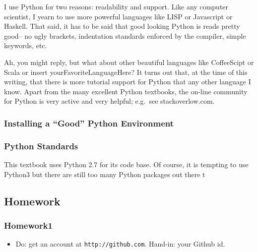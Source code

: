 I use Python for two reasons: readability and support. Like any computer
scientist, I yearn to use more powerful languages like LISP or
Javascript or Haskell. That said, it has to be said that good looking
Python is reads pretty good-- no ugly brackets, indentation standards
enforced by the compiler, simple keywords, etc.

Ah, you might reply, but what about other beautiful languages like
CoffeeScipt or Scala or insert yourFavoriteLanguageHere? It turns out
that, at the time of this writing, that there is more tutorial support
for Python that any other language I know. Apart from the many excellent
Python textbooks, the on-line community for Python is very active and
very helpful; e.g.~see stackoverlow.com.

\subsubsection{Installing a ``Good'' Python
Environment}\label{installing-a-good-python-environment}

\subsubsection{Python Standards}\label{python-standards}

This textbook uses Python 2.7 for its code base. Of course, it is
tempting to use Python3 but there are still too many Python packages out
there t

\subsection{Homework}\label{homework}

\subsubsection{Homework1}\label{homework1}

\begin{itemize}
\itemsep1pt\parskip0pt
\item
  Do: get an account at \texttt{http://github.com}. Hand-in: your Github
  id.
\end{itemize}
